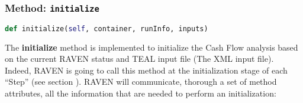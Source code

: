 \subsubsection{Method: \texttt{initialize}}
\label{subsubsec:externalInitializeExternalModelPlugin}
\begin{lstlisting}[language=python]
def initialize(self, container, runInfo, inputs)
\end{lstlisting}

The \textbf{initialize} method is implemented  to initialize the Cash Flow analysis based on
the current RAVEN status and TEAL input file (The XML input file).
%
 \\Indeed, RAVEN is going to call this method at the initialization stage of each ``Step'' (see section \cite{RAVENuserManual}).
%
RAVEN will communicate, thorough a set of method attributes, all the information
that are needed to perform an initialization:
